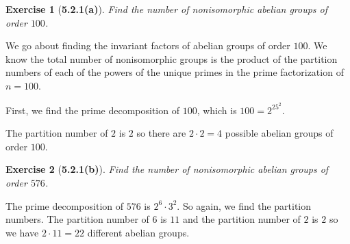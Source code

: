 \documentclass[10pt,oneside,reqno]{amsart}
\theoremstyle{plain}
\newtheorem*{e}{Exercise}
\theoremstyle{definition}
\begin{document}
\begin{e}[\textbf{5.2.1(a)}]
Find the number of nonisomorphic abelian groups of order $100$. 
\end{e}
We go about finding the invariant factors of abelian groups of order $100$. We know the total number of nonisomorphic groups is the product of the partition numbers of each of the powers of the unique primes in the prime factorization of $n = 100$. 


First, we find the prime decomposition of $100$, which is $100=2^25^2$.


The partition number of $2$ is $2$ so there are $2 \cdot 2 = 4$ possible abelian groups of order $100$. 

\begin{comment} We must have $2\cdot 5 \mid n_1$, so our possible values for $n_1$ are
\begin{itemize}
\item $2\cdot 5,$
\item $2^2\cdot 5,$
\item $2\cdot 5^2,$
\item $2^2\cdot 5^2.$
\end{itemize}
If $n_1 = 2 \cdot 5$, then the possible values for $n_2$ are $2,5,2\cdot 5$. If $n_2$ is $2$ or $5$ we must have a third term since $\prod n_i = n$ and we must have $n_3 = n_2$ since $n_3 \mid n_2$ which is not possible since then we would not have $\prod n_i = n$. So $n_2 = 2 \cdot 5$. 

If $n_1$ is $2^2 \cdot 5$ or $2\cdot 5^2$ the only possible values for $n_2$ are $5$ and $2$ respectively, and these complete the list.


And if $n_1 = 2^2\cdot 5^2$, we are done. So the possible abelian groups are $\mathbb{Z}_{100}, \mathbb{Z}_{20} \times \mathbb{Z}_5, \mathbb{Z}_{50} \times \mathbb{Z}_2, \mathbb{Z}_{10}^2$, and there are 4 or them. \end{comment}
\begin{e}[\textbf{5.2.1(b)}]
Find the number of nonisomorphic abelian groups of order $576$. 
\end{e}
The prime decomposition of $576$ is $2^6 \cdot 3^2$. So again, we find the partition numbers. The partition number of $6$ is $11$ and the partition number of $2$ is $2$ so we have $2 \cdot 11 = 22$ different abelian groups. 
\end{document}
